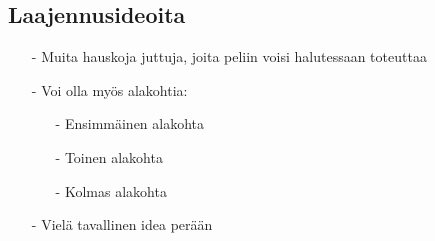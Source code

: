 \documentclass[12pt,twoside]{article}
\begin{document}
\subsection*{Laajennusideoita}
\begin{itemize}
	\item[-] Muita hauskoja juttuja, joita peliin voisi halutessaan toteuttaa
	\item[-] Voi olla myös alakohtia:
	\begin{itemize}
		\item[-] Ensimmäinen alakohta
		\item[-] Toinen alakohta
		\item[-] Kolmas alakohta
	\end{itemize} 
	\item[-] Vielä tavallinen idea perään
\end{itemize}
\end{document}
